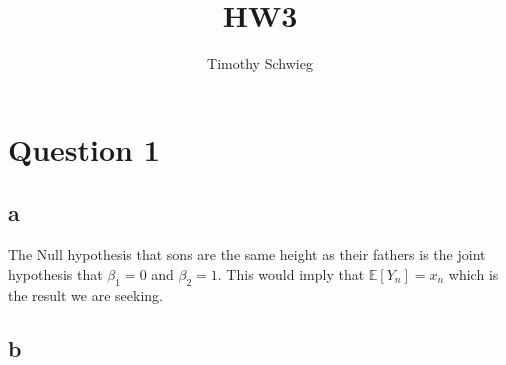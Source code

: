 \documentclass[10pt]{paper}\usepackage[]{graphicx}\usepackage[]{color}
\title{HW3}
\author{Timothy Schwieg}
\begin{document}
\maketitle

\section*{Question 1}

\subsection*{a}

The Null hypothesis that sons are the same height as their fathers is the joint
hypothesis that $\beta_1 = 0$ and $\beta_2 = 1$. This would imply that $\mathbb{E}[Y_n]
= x_n$ which is the result we are seeking.

\subsection*{b}
\end{document}
